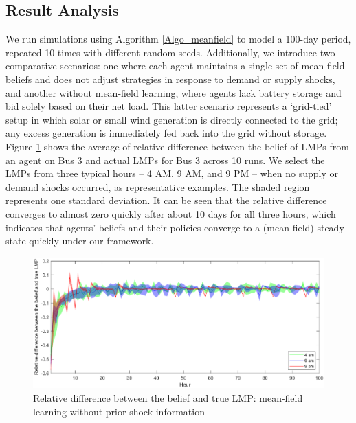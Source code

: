 \documentclass{article}
\theoremstyle{definition}
\theoremstyle{plain}
\begin{document}
\subsection{Result Analysis}
We run simulations using Algorithm \ref{Algo_meanfield} to model a 100-day period, repeated 10 times with different random seeds. Additionally,  we introduce two comparative scenarios: one where each agent maintains a single set of mean-field beliefs and does not adjust strategies in response to demand or supply shocks, and another without mean-field learning, where agents lack battery storage and bid solely based on their net load. This latter scenario represents a `grid-tied' setup in which solar or small wind generation is directly connected to the grid; any excess generation is immediately fed back into the grid without storage. 
Figure \ref{fig:diff} shows the average of relative difference between the belief of LMPs from an agent on Bus 3 and actual LMPs for Bus 3 across 10 runs. We select the LMPs from three typical hours -- 4 AM, 9 AM, and 9 PM -- when no supply or demand shocks occurred, as representative examples. 
The shaded region represents one standard deviation. It can be seen that the relative difference converges to almost zero quickly after about 10 days for all three hours, which indicates that agents' beliefs and their policies converge to a (mean-field) steady state quickly under our framework.
\begin{figure}[!h]
   \centering
    \includegraphics[width=\textwidth]{3diff.eps}
    \caption{Relative difference between the belief and true LMP: mean-field learning without prior shock information}     \label{fig:diff}
\end{figure}
\end{document}
